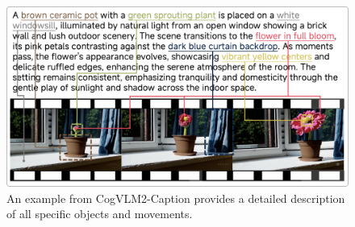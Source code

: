 \begin{figure}[h]
\begin{center}
\includegraphics[width=0.9\linewidth]{images/v2t/detail_example.png}
\end{center}
\caption{An example from CogVLM2-Caption provides a detailed description of all specific objects and movements.}
\label{fig:v2t}
\end{figure}